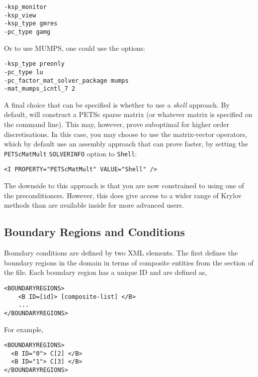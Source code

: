 \begin{lstlisting}[style=BashInputStyle]
-ksp_monitor
-ksp_view
-ksp_type gmres
-pc_type gamg
\end{lstlisting}

Or to use MUMPS, one could use the options:

\begin{lstlisting}[style=BashInputStyle]
-ksp_type preonly
-pc_type lu
-pc_factor_mat_solver_package mumps
-mat_mumps_icntl_7 2
\end{lstlisting}

A final choice that can be specified is whether to use a \emph{shell}
approach. By default, \nekpp will construct a PETSc sparse matrix (or whatever
matrix is specified on the command line). This may, however, prove suboptimal
for higher order discretisations. In this case, you may choose to use the \nekpp
matrix-vector operators, which by default use an assembly approach that can
prove faster, by setting the \texttt{PETScMatMult} \texttt{SOLVERINFO} option to
\texttt{Shell}:

\begin{lstlisting}[style=XMLStyle]
<I PROPERTY="PETScMatMult" VALUE="Shell" />
\end{lstlisting}

The downside to this approach is that you are now constrained to using one of
the \nekpp preconditioners. However, this does give access to a wider range of
Krylov methods than are available inside \nekpp for more advanced users.

\subsection{Boundary Regions and Conditions}

Boundary conditions are defined by two XML elements. The first defines the
boundary regions in the domain in terms of composite entities from the
 section of the file. Each boundary region has a unique ID and
are defined as, 
\begin{lstlisting}[style=XMLStyle]
<BOUNDARYREGIONS>
    <B ID=[id]> [composite-list] </B>
    ...
</BOUNDARYREGIONS>
\end{lstlisting}
For example,
\begin{lstlisting}[style=XMLStyle]
<BOUNDARYREGIONS>
  <B ID="0"> C[2] </B>
  <B ID="1"> C[3] </B>
</BOUNDARYREGIONS>
\end{lstlisting}

